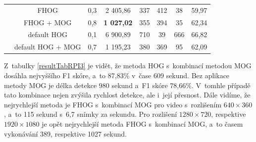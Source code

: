 \begin{table}[H]
\begin{tabular}{|c|c|c|c|c|c|c|c|}
      & FHOG                         &  0,3            & 2 405,86     & 337 &   412 &     38 &      59,97      \\ \cline{2-8}  
      & FHOG + MOG                   &  0,8            & \textbf{1 027,02}     & 355 &   394 &     35 &      62,34      \\ \cline{2-8}   
      &  default HOG                 &  0,1            & 6 900,89     & 710 &   39 &      666 &     66,82      \\ \cline{2-8}  
      &  default HOG + MOG           &  0,7            & 1 195,23     & 380 &  369 &     95 &      62,09      \\ \hline
\end{tabular}
\end{table}
Z~tabulky \ref{resultTabRPI3} je vidět, že metoda HOG s~kombinací metodou MOG dosáhla nejvyššího F1 skóre, a~to 87,83\% v~čase 609 sekund. Bez aplikace metody MOG je délka detekce 980 sekund a~F1 skóre 78,66\%. V~tomhle případě tato kombinace nejen zvýšila rychlost detekce, ale i~její přesnost. Dále vidíme, že nejrychlejší metoda je FHOG s~kombinací MOG pro video s~rozlišením $640\times360$, a~to 115 sekund s~6,7 snímky za sekundu. Pro rozlišení $1280\times720$, respektive $1920\times1080$ je opět nejrychlejší metoda FHOG s~kombinací MOG, a~to časem vykonávání 389, respektive 1027 sekund.

